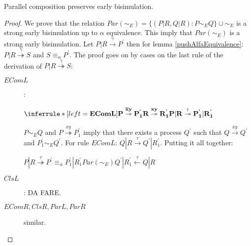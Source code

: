 \begin{lemma}\label{parallelCompositionPreservesEarlyBisimulation}
  Parallel composition preserves early bisimulation.
  \begin{proof}
    We prove that the relation $Par(\sim_{E})=\{(P|R, Q|R): P\sim_{E} Q\} \cup \sim_{E}$ is a strong early bisimulation up to $\alpha$ equivalence. This imply that $Par(\sim_{E})$ is a strong early bisimulation. Let $P|R \xrightarrow{\gamma} P^{'}$ then for lemma \ref{pushAlfaEquivalence}: $P|R \stackrel{\gamma}{\twoheadrightarrow} S$ and $S\equiv_{\alpha} P^{'}$. The proof goes on by cases on the last rule of the derivation of $P|R \stackrel{\gamma}{\twoheadrightarrow} S$:
    \begin{description}
      \item[$EComL$]:
	    \begin{center}
	      $\inferrule* [left=\bf{EComL}]{
		      P \stackrel{\overline{x}y}{\twoheadrightarrow} P_{1}^{'}
		    \\
		      R \stackrel{xy}{\twoheadrightarrow} R_{1}^{'}
		  }{
		    P|R \stackrel{\tau}{\twoheadrightarrow} P_{1}^{'}|R_{1}^{'}
		  }$
	    \end{center}
	$P\sim_{E} Q$ and $P \stackrel{\overline{x}y}{\twoheadrightarrow} P_{1}^{'}$ imply that there exists a process $Q^{'}$ such that $Q \xrightarrow{\overline{x}y} Q^{'}$ and $P_{1}^{'}\sim_{E} Q^{'}$. For rule $EComL$: $Q|R \xrightarrow{\tau} Q^{'}|R_{1}^{'}$. Putting it all together:
	\begin{center}
	  $P|R \stackrel{\tau}{\twoheadrightarrow} P^{'} \equiv_{\alpha} P_{1}^{'}|R_{1}^{'} Par(\sim_{E}) Q^{'}|R_{1}^{'} \stackrel{\tau}{\leftarrow} Q|R$
	\end{center}
      \item[$ClsL$]: DA FARE.
      \item[$EComR, ClsR, ParL, ParR$] similar.
    \end{description}
  \end{proof}
\end{lemma}


